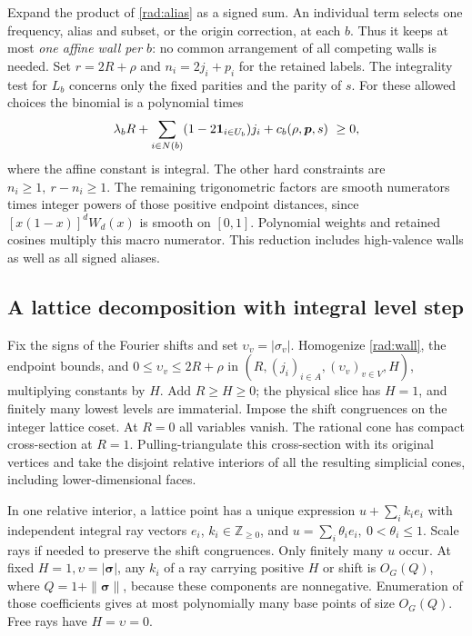 Expand the product of \eqref{rad:alias} as a signed sum. An
individual term selects one frequency, alias and subset, or
the origin correction, at each \(b\). Thus it keeps at most
\emph{one affine wall per \(b\)}: no common arrangement of all
competing walls is needed. Set \(r=2R+\rho\) and \(n_i=2j_i+p_i\)
for the retained labels. The integrality test for \(L_b\)
concerns only the fixed parities and the parity of \(s\).
For these allowed choices the binomial is a polynomial times
\begin{equation}
  \lambda_b R+\sum_{i\in N(b)}(1-2{\bf1}_{i\in U_b})j_i
              +c_b(\rho,\boldsymbol p,s)\ \ge0 ,
 \label{rad:wall}
\end{equation}
where the affine constant is integral. The other hard constraints
are \(n_i\ge1,\ r-n_i\ge1\). The remaining trigonometric factors
are smooth numerators times integer powers of those positive
endpoint distances, since \([x(1-x)]^dW_d(x)\) is smooth on
\([0,1]\). Polynomial weights and retained cosines multiply
this macro numerator. This reduction includes high-valence
walls as well as all signed aliases.

\subsection{A lattice decomposition with integral level step}
\label{rad:cone}

Fix the signs of the Fourier shifts and set
\(\upsilon_v=|\sigma_v|\). Homogenize \eqref{rad:wall}, the
endpoint bounds, and \(0\le\upsilon_v\le 2R+\rho\) in
\((R,(j_i)_{i\in A},(\upsilon_v)_{v\in V},H)\),
multiplying constants by \(H\). Add \(R\ge H\ge0\); the physical
slice has \(H=1\), and finitely many lowest levels are immaterial.
Impose the shift congruences on the integer lattice coset.
At \(R=0\) all variables vanish. The rational cone has compact
cross-section at \(R=1\). Pulling-triangulate this cross-section
with its original vertices and take the disjoint relative
interiors of all the resulting simplicial cones, including
lower-dimensional faces.

In one relative interior, a lattice point has a unique expression
\(u+\sum_i k_i e_i\) with independent integral ray vectors \(e_i\),
\(k_i\in\mathbb Z_{\ge0}\), and
\(u=\sum_i\theta_i e_i,\ 0<\theta_i\le1\). Scale rays if needed to
preserve the shift congruences. Only finitely many \(u\) occur.
At fixed \(H=1,\upsilon=|\boldsymbol\sigma|\), any \(k_i\) of a
ray carrying positive \(H\) or shift is \(O_G(Q)\), where
\(Q=1+\|\boldsymbol\sigma\|\), because these components are
nonnegative. Enumeration of those coefficients gives at most
polynomially many base points of size \(O_G(Q)\). Free rays have
\(H=\upsilon=0\).

